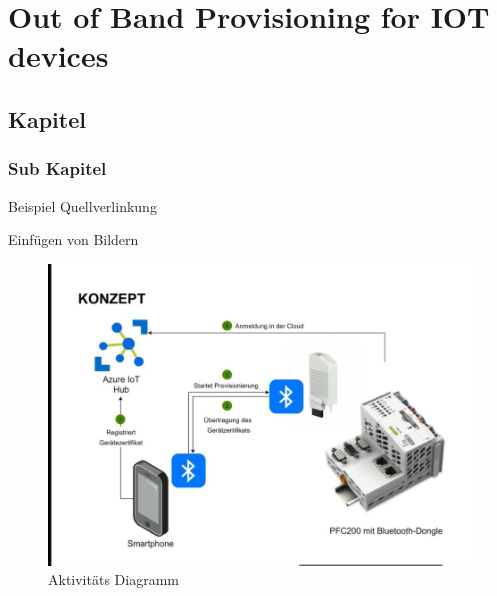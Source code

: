 \chapter{Out of Band Provisioning for IOT devices}
    
\section{Kapitel}
\subsection{Sub Kapitel}
Beispiel Quellverlinkung \cite{[1]}
%

Einfügen von Bildern
\begin{figure}[h]
    \centering
    \includegraphics[width=15cm]{pictures/entwurf}
    \caption{Aktivitäts Diagramm}
\end{figure}
